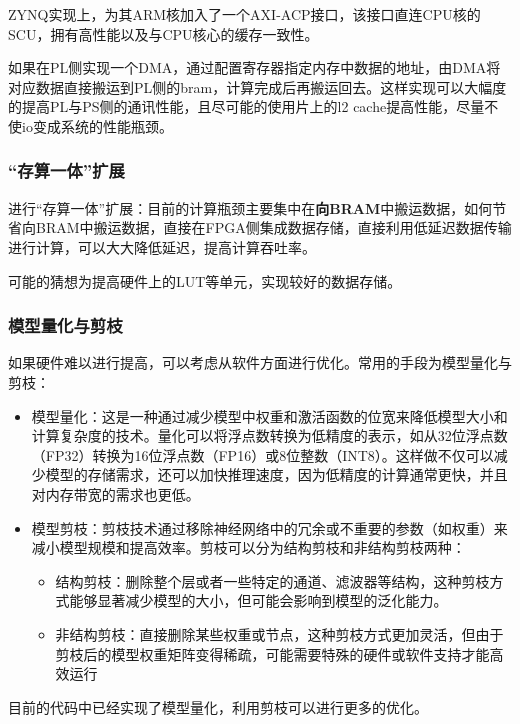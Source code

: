 \documentclass[12pt,a4paper]{article}
\begin{document}
ZYNQ实现上，为其ARM核加入了一个AXI-ACP接口，该接口直连CPU核的SCU，拥有高性能以及与CPU核心的缓存一致性。

如果在PL侧实现一个DMA，通过配置寄存器指定内存中数据的地址，由DMA将对应数据直接搬运到PL侧的bram，计算完成后再搬运回去。这样实现可以大幅度的提高PL与PS侧的通讯性能，且尽可能的使用片上的l2
cache提高性能，尽量不使io变成系统的性能瓶颈。

\subsubsection{“存算一体”扩展}

进行“存算一体”扩展：目前的计算瓶颈主要集中在\textbf{向BRAM}中搬运数据，如何节省向BRAM中搬运数据，直接在FPGA侧集成数据存储，直接利用低延迟数据传输进行计算，可以大大降低延迟，提高计算吞吐率。

可能的猜想为提高硬件上的LUT等单元，实现较好的数据存储。

\subsubsection{模型量化与剪枝}

如果硬件难以进行提高，可以考虑从软件方面进行优化。常用的手段为模型量化与剪枝：

\begin{itemize}
\item
  模型量化：这是一种通过减少模型中权重和激活函数的位宽来降低模型大小和计算复杂度的技术。量化可以将浮点数转换为低精度的表示，如从32位浮点数（FP32）转换为16位浮点数（FP16）或8位整数（INT8）。这样做不仅可以减少模型的存储需求，还可以加快推理速度，因为低精度的计算通常更快，并且对内存带宽的需求也更低。
\item
  模型剪枝：剪枝技术通过移除神经网络中的冗余或不重要的参数（如权重）来减小模型规模和提高效率。剪枝可以分为结构剪枝和非结构剪枝两种：

  \begin{itemize}
  \item
    结构剪枝：删除整个层或者一些特定的通道、滤波器等结构，这种剪枝方式能够显著减少模型的大小，但可能会影响到模型的泛化能力。
  \item
    非结构剪枝：直接删除某些权重或节点，这种剪枝方式更加灵活，但由于剪枝后的模型权重矩阵变得稀疏，可能需要特殊的硬件或软件支持才能高效运行
  \end{itemize}
\end{itemize}

目前的代码中已经实现了模型量化，利用剪枝可以进行更多的优化。
\end{document}
